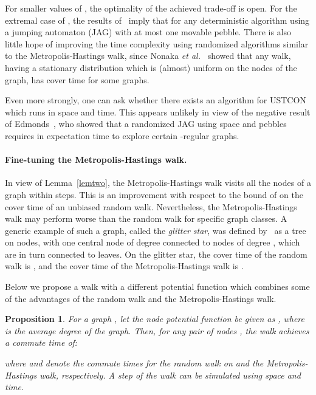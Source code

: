 \documentclass[11pt,a4paper]{article}
\newtheorem{proposition}{Proposition}
\newcommand{\etal}{\textsl{et al.}\xspace}
\renewcommand{\*}{\hspace*{5mm}}
\begin{document}
For smaller values of , the optimality of the achieved trade-off  is open. For the extremal case of , the results of~\cite{BBRRT} imply that  for any deterministic algorithm using a jumping automaton (JAG) with at most one movable pebble. There is also little hope of improving the time complexity using randomized algorithms similar to the Metropolis-Hastings walk, since Nonaka \etal~\cite{NOSY} showed that any walk, having a stationary distribution which is (almost) uniform on the nodes of the graph, has  cover time for some graphs.

Even more strongly, one can ask whether there exists an algorithm for USTCON which runs in  space and  time. This appears unlikely in view of the negative result of Edmonds~\cite{E}, who showed that a randomized JAG using  space and  pebbles requires in expectation  time to explore certain -regular graphs.

\paragraph{Fine-tuning the Metropolis-Hastings walk.}\label{sec52}

In view of Lemma~\ref{lemtwo}, the Metropolis-Hastings walk visits all the nodes of a graph within  steps. This is an improvement with respect to the bound of  on the cover time of an unbiased random walk. Nevertheless, the Metropolis-Hastings walk may perform worse than the random walk for specific graph classes. A generic example of such a graph, called the \emph{glitter star}, was defined by~\cite{NOSY} as a tree on  nodes, with one central node of degree  connected to  nodes of degree , which are in turn connected to  leaves. On the glitter star, the cover time of the random walk is , and the cover time of the Metropolis-Hastings walk is .

Below we propose a walk  with a different potential function which combines some of the advantages of the random walk and the Metropolis-Hastings walk.

\begin{proposition}\label{probla}
For a graph , let the node potential function  be given as , where  is the average degree of the graph.  Then, for any pair of nodes , the walk  achieves a commute time of:

where  and  denote the commute times for the random walk on  and the Metropolis-Hastings walk, respectively. A step of the walk  can be simulated using  space and time.
\end{proposition}
\end{document}
